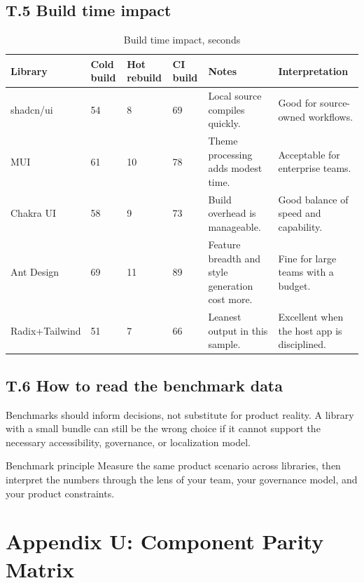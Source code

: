 \subsection*{T.5 Build time impact}
\begin{table}[htbp]
  \centering
  \caption{Build time impact, seconds}
  \begin{tabularx}{\textwidth}{@{}p{}p{}p{}p{}p{}Y@{}}
    \toprule
    \textbf{Library} & \textbf{Cold build} & \textbf{Hot rebuild} & \textbf{CI build} & \textbf{Notes} & \textbf{Interpretation} \\
    \midrule
    shadcn/ui & 54 & 8 & 69 & Local source compiles quickly. & Good for source-owned workflows. \\
    MUI & 61 & 10 & 78 & Theme processing adds modest time. & Acceptable for enterprise teams. \\
    Chakra UI & 58 & 9 & 73 & Build overhead is manageable. & Good balance of speed and capability. \\
    Ant Design & 69 & 11 & 89 & Feature breadth and style generation cost more. & Fine for large teams with a budget. \\
    Radix+Tailwind & 51 & 7 & 66 & Leanest output in this sample. & Excellent when the host app is disciplined. \\
    \bottomrule
  \end{tabularx}
\end{table}

\subsection*{T.6 How to read the benchmark data}
Benchmarks should inform decisions, not substitute for product reality. A library with a small bundle can still be the wrong choice if it cannot support the necessary accessibility, governance, or localization model.

\begin{highlightbox}{Benchmark principle}
Measure the same product scenario across libraries, then interpret the numbers through the lens of your team, your governance model, and your product constraints.
\end{highlightbox}

\clearpage
{}
\section*{Appendix U: Component Parity Matrix}

